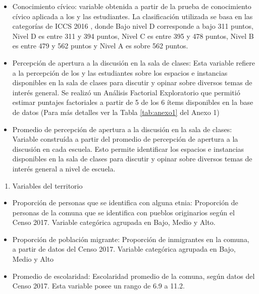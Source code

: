 \documentclass[12pt,twoside]{templates/facsothesis}
\providecommand{\tightlist}{%
  \setlength{\itemsep}{0pt}\setlength{\parskip}{0pt}}
\begin{document}
\begin{itemize}
\item
  Conocimiento cívico: variable obtenida a partir de la prueba de conocimiento cívico aplicada a los y las estudiantes. La clasificación utilizada se basa en las categorías de ICCS 2016 \citep{agenciacalidaddelaeducacion_informe_2018}, donde Bajo nivel D corresponde a bajo 311 puntos, Nivel D es entre 311 y 394 puntos, Nivel C es entre 395 y 478 puntos, Nivel B es entre 479 y 562 puntos y Nivel A es sobre 562 puntos.
\item
  Percepción de apertura a la discusión en la sala de clases: Esta variable refiere a la percepción de los y las estudiantes sobre los espacios e instancias disponibles en la sala de clases para discutir y opinar sobre diversos temas de interés general. Se realizó un Análisis Factorial Exploratorio que permitió estimar puntajes factoriales a partir de 5 de los 6 ítems disponibles en la base de datos (Para más detalles ver la Tabla \ref{tab:anexo1} del Anexo 1)
\item
  Promedio de percepción de apertura a la discusión en la sala de clases: Variable construída a partir del promedio de percepción de apertura a la discusión en cada escuela. Esto permite identificar los espacios e instancias disponibles en la sala de clases para discutir y opinar sobre diversos temas de interés general a nivel de escuela.
\end{itemize}

\begin{enumerate}
\def\labelenumi{\arabic{enumi})}
\setcounter{enumi}{2}
\tightlist
\item
  Variables del territorio
\end{enumerate}

\begin{itemize}
\item
  Proporción de personas que se identifica con alguna etnia: Proporción de personas de la comuna que se identifica con pueblos originarios según el Censo 2017. Variable categórica agrupada en Bajo, Medio y Alto.
\item
  Proporción de población migrante: Proporción de inmigrantes en la comuna, a partir de datos del Censo 2017. Variable categórica agrupada en Bajo, Medio y Alto
\item
  Promedio de escolaridad: Escolaridad promedio de la comuna, según datos del Censo 2017. Esta variable posee un rango de 6.9 a 11.2.
\end{itemize}
\end{document}
